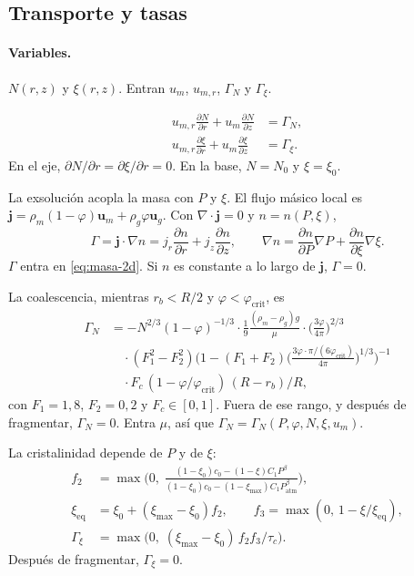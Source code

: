 \documentclass[11pt,a4paper]{article}
\newcommand{\p}{\partial}
\begin{document}
\subsection{Transporte y tasas}

\paragraph{Variables.}
$N(r,z)$ y $\xi(r,z)$. Entran $u_m$, $u_{m,r}$, $\Gamma_N$ y
$\Gamma_\xi$.

\begin{align}
\label{eq:Nxi-2d}
u_{m,r}\frac{\p N}{\p r}+u_m\frac{\p N}{\p z}
&=\Gamma_N,
\\
u_{m,r}\frac{\p \xi}{\p r}+u_m\frac{\p \xi}{\p z}
&=\Gamma_\xi.
\end{align}
En el eje, $\p N/\p r=\p\xi/\p r=0$. En la base, $N=N_0$ y
$\xi=\xi_0$.

La exsolución acopla la masa con $P$ y $\xi$. El flujo másico local
es $\mathbf{j}=\rho_m(1-\varphi)\mathbf{u}_m+\rho_g\varphi\mathbf{u}_g$.
Con $\nabla\cdot\mathbf{j}=0$ y $n=n(P,\xi)$,
\begin{equation}
\label{eq:Gamma}
\Gamma
=\mathbf{j}\cdot\nabla n
=j_r\frac{\p n}{\p r}+j_z\frac{\p n}{\p z},
\qquad
\nabla n
=\frac{\p n}{\p P}\nabla P+\frac{\p n}{\p\xi}\nabla\xi.
\end{equation}
$\Gamma$ entra en \eqref{eq:masa-2d}. Si $n$ es constante a lo largo
de $\mathbf{j}$, $\Gamma=0$.

La coalescencia, mientras $r_b<R/2$ y $\varphi<\varphi_{\mathrm{crit}}$,
es
\begin{equation}
\label{eq:GammaN}
\begin{aligned}
\Gamma_N
&=-N^{2/3}(1-\varphi)^{-1/3}
\cdot\frac19\frac{(\rho_m-\rho_g)g}{\mu}
\cdot\Biggl(\frac{3\varphi}{4\pi}\Biggr)^{2/3}
\\
&\quad\cdot(F_1^2-F_2^2)
\Biggl(1-(F_1+F_2)
\Biggl(\frac{3\varphi\cdot\pi/(6\varphi_{\mathrm{crit}})}{4\pi}\Biggr)^{1/3}
\Biggr)^{-1}
\\
&\quad\cdot F_c\,(1-\varphi/\varphi_{\mathrm{crit}})\,(R-r_b)/R,
\end{aligned}
\end{equation}
con $F_1=1{,}8$, $F_2=0{,}2$ y $F_c\in[0,1]$. Fuera de ese rango, y
después de fragmentar, $\Gamma_N=0$. Entra $\mu$, así que
$\Gamma_N=\Gamma_N(P,\varphi,N,\xi,u_m)$.

La cristalinidad depende de $P$ y de $\xi$:
\begin{equation}
\label{eq:Gammaxi}
\begin{aligned}
f_2
&=\max\Biggl(0,\;
\frac{(1-\xi_0)c_0-(1-\xi)C_1 P^{\beta}}
{(1-\xi_0)c_0-(1-\xi_{\max})C_1 P_{\mathrm{atm}}^{\beta}}\Biggr),
\\
\xi_{\mathrm{eq}}
&=\xi_0+(\xi_{\max}-\xi_0)f_2,
\qquad
f_3=\max(0,\,1-\xi/\xi_{\mathrm{eq}}),
\\
\Gamma_\xi
&=\max\bigl(0,\;(\xi_{\max}-\xi_0)\,f_2 f_3/\tau_c\bigr).
\end{aligned}
\end{equation}
Después de fragmentar, $\Gamma_\xi=0$.
\end{document}
